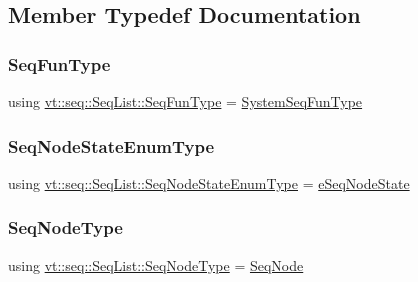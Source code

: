 \subsection{Member Typedef Documentation}
\mbox{\label{structvt_1_1seq_1_1_seq_list_afa5aacad3530e543d1ea016acbfb1cbb}} 
\subsubsection{\texorpdfstring{Seq\+Fun\+Type}{SeqFunType}}
{\footnotesize\ttfamily using \hyperlink{structvt_1_1seq_1_1_seq_list_afa5aacad3530e543d1ea016acbfb1cbb}{vt\+::seq\+::\+Seq\+List\+::\+Seq\+Fun\+Type} =  \hyperlink{namespacevt_1_1seq_a80eeb50c74a4a3bd46fcf4d5213c5ebe}{System\+Seq\+Fun\+Type}}

\mbox{\label{structvt_1_1seq_1_1_seq_list_a0e985bbbf299669fbc45bc693b663d89}} 
\subsubsection{\texorpdfstring{Seq\+Node\+State\+Enum\+Type}{SeqNodeStateEnumType}}
{\footnotesize\ttfamily using \hyperlink{namespacevt_1_1seq_ad7b0496818667d816e00f717491d3b92}{vt\+::seq\+::\+Seq\+List\+::\+Seq\+Node\+State\+Enum\+Type} =  \hyperlink{namespacevt_1_1seq_ad7b0496818667d816e00f717491d3b92}{e\+Seq\+Node\+State}}

\mbox{\label{structvt_1_1seq_1_1_seq_list_a3a95b02ac8cc454e44abfd249f665256}} 
\subsubsection{\texorpdfstring{Seq\+Node\+Type}{SeqNodeType}}
{\footnotesize\ttfamily using \hyperlink{structvt_1_1seq_1_1_seq_list_a3a95b02ac8cc454e44abfd249f665256}{vt\+::seq\+::\+Seq\+List\+::\+Seq\+Node\+Type} =  \hyperlink{structvt_1_1seq_1_1_seq_node}{Seq\+Node}}



